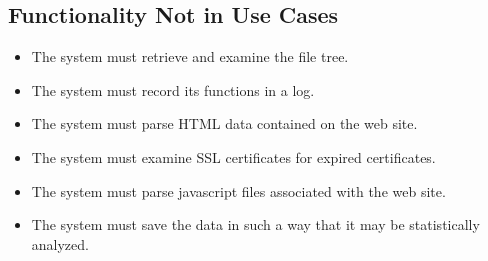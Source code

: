 \subsection{Functionality Not in Use Cases}
\begin{itemize} 
    \item The system must retrieve and examine the file tree.
    \item The system must record its functions in a log.
    \item The system must parse HTML data contained on the web site.
    \item The system must examine SSL certificates for expired certificates.
    \item The system must parse javascript files associated with the web site.
    \item The system must save the data in such a way that it may be statistically analyzed.
\end{itemize}
